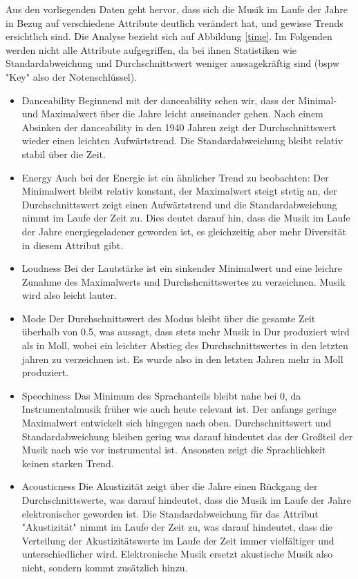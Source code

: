 \documentclass[conference]{IEEEtran}
\begin{document}
Aus den vorliegenden Daten geht hervor, dass sich die Musik im Laufe der Jahre in Bezug auf verschiedene Attribute deutlich verändert hat, und gewisse Trends ersichtlich sind. Die Analyse bezieht sich auf Abbildung \ref{time}. Im Folgenden werden nicht alle Attribute aufgegriffen, da bei ihnen Statistiken wie Standardabweichung und Durchschnittswert weniger aussagekräftig sind (bspw "Key" also der Notenschlüssel).

\begin{itemize}
\item{Danceability} Beginnend mit der danceability sehen wir, dass der Minimal- und Maximalwert über die Jahre leicht auseinander gehen. Nach einem Absinken der danceability in den 1940 Jahren zeigt der Durchschnittswert wieder einen leichten Aufwärtstrend. Die Standardabweichung bleibt relativ stabil über die Zeit.

\item{Energy} Auch bei der Energie ist ein ähnlicher Trend zu beobachten: Der Minimalwert bleibt relativ konstant, der Maximalwert steigt stetig an, der Durchschnittswert zeigt einen Aufwärtstrend und die Standardabweichung nimmt im Laufe der Zeit zu. Dies deutet darauf hin, dass die Musik im Laufe der Jahre energiegeladener geworden ist, es gleichzeitig aber mehr Diversität in diesem Attribut gibt.

\item{Loudness} Bei der Lautstärke ist ein sinkender Minimalwert und eine leichre Zunahme des Maximalwerts und Durchshcnittswertes zu verzeichnen. Musik wird also leicht lauter.

\item{Mode} Der Durchschnittswert des Modus bleibt über die gesamte Zeit überhalb von 0.5, was aussagt, dass stets mehr Musik in Dur produziert wird als in Moll, wobei ein leichter Abstieg des Durchschnittswertes in den letzten jahren zu verzeichnen ist. Es wurde also in den letzten Jahren mehr in Moll produziert.

\item{Speechiness} Das Minimum des Sprachanteils bleibt nahe bei 0, da Instrumentalmusik früher wie auch heute relevant ist. Der anfangs geringe Maximalwert entwickelt sich hingegen nach oben. Durchschnittswert und Standardabweichung bleiben gering was darauf hindeutet das der Großteil der Musik nach wie vor instrumental ist. Ansonsten zeigt die Sprachlichkeit keinen starken Trend.

\item{Acousticness} Die Akustizität zeigt über die Jahre einen Rückgang der Durchschnittswerte, was darauf hindeutet, dass die Musik im Laufe der Jahre elektronischer geworden ist. Die Standardabweichung für das Attribut "Akustizität" nimmt im Laufe der Zeit zu, was darauf hindeutet, dass die Verteilung der Akustizitätswerte im Laufe der Zeit immer vielfältiger und unterschiedlicher wird. Elektronische Musik ersetzt akustische Musik also nicht, sondern kommt zusätzlich hinzu. 


\end{itemize}
\end{document}
